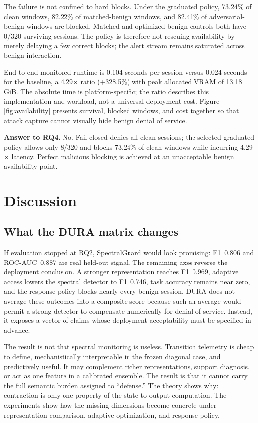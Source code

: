 \documentclass[sigconf]{acmart}
\newcommand{\answerbox}[2]{\par\smallskip\noindent
  \colorbox{SGPale}{\parbox{\dimexpr\columnwidth-2\fboxsep\relax}{
  \textbf{Answer to #1.} #2}}\par\smallskip}
\begin{document}
The failure is not confined to hard blocks. Under the graduated policy,
73.24\% of clean windows, 82.22\% of matched-benign windows, and 82.41\% of
adversarial-benign windows are blocked. Matched and optimized benign controls
both have 0/320 surviving sessions. The policy is therefore not rescuing
availability by merely delaying a few correct blocks; the alert stream remains
saturated across benign interaction.

End-to-end monitored runtime is 0.104 seconds per session versus 0.024 seconds
for the baseline, a 4.29$\times$ ratio (+328.5\%) with peak allocated VRAM of
13.18 GiB. The absolute time is platform-specific; the ratio describes this
implementation and workload, not a universal deployment cost. Figure
\ref{fig:availability} presents survival, blocked windows, and cost together so
that attack capture cannot visually hide benign denial of service.

\answerbox{RQ4}{No. Fail-closed denies all clean sessions; the selected
graduated policy allows only 8/320 and blocks 73.24\% of clean windows while
incurring 4.29$\times$ latency. Perfect malicious blocking is achieved at an
unacceptable benign availability point.}

\FloatBarrier

\section{Discussion}
\subsection{What the DURA matrix changes}
If evaluation stopped at RQ2, SpectralGuard would look promising: F1~0.806 and
ROC-AUC~0.887 are real held-out signal. The remaining axes reverse the deployment
conclusion. A stronger representation reaches F1~0.969, adaptive access lowers
the spectral detector to F1~0.746, task accuracy remains near zero, and the
response policy blocks nearly every benign session. DURA does not average
these outcomes into a composite score because such an average would permit a
strong detector to compensate numerically for denial of service. Instead, it
exposes a vector of claims whose deployment acceptability must be specified in
advance.

The result is not that spectral monitoring is useless. Transition telemetry is
cheap to define, mechanistically interpretable in the frozen diagonal case,
and predictively useful. It may complement richer representations, support
diagnosis, or act as one feature in a calibrated ensemble. The result is that
it cannot carry the full semantic burden assigned to ``defense.'' The theory
shows why: contraction is only one property of the state-to-output computation.
The experiments show how the missing dimensions become concrete under
representation comparison, adaptive optimization, and response policy.
\end{document}
